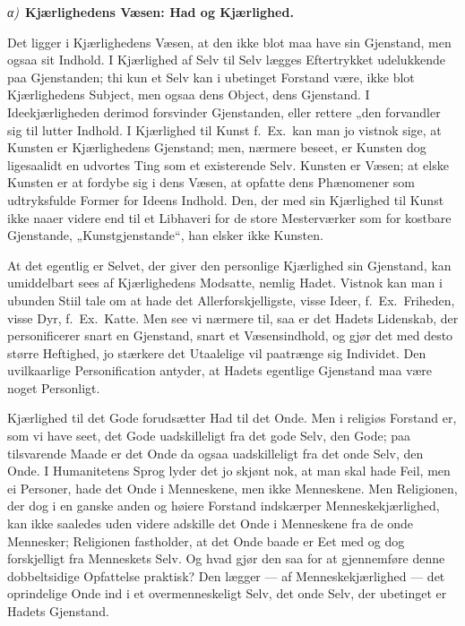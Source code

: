 \documentclass[12pt]{book}
\newcommand{\greekrun}[2]{%
  \medskip\begin{center}{\itshape #1)}\ {\bfseries #2}\end{center}\medskip}
\begin{document}
\greekrun{α}{Kjærlighedens Væsen: Had og Kjærlighed.}

Det ligger i Kjærlighedens Væsen, at den ikke blot maa have sin
Gjenstand, men ogsaa sit Indhold. I Kjærlighed af Selv til Selv
lægges Eftertrykket udelukkende paa Gjenstanden; thi kun et Selv kan
i ubetinget Forstand være, ikke blot Kjærlighedens Subject, men
ogsaa dens Object, dens Gjenstand. I Ideekjærligheden derimod
forsvinder Gjenstanden, eller rettere „den forvandler sig til lutter
Indhold.
I Kjærlighed til Kunst f.\ Ex.\ kan man jo vistnok sige,
at Kunsten er Kjærlighedens Gjenstand; men, nærmere beseet, er
Kunsten dog ligesaalidt en udvortes Ting som et existerende Selv.
Kunsten er Væsen; at elske Kunsten er at fordybe sig i dens Væsen,
at opfatte dens Phænomener som udtryksfulde Former for Ideens
Indhold. Den, der med sin Kjærlighed til Kunst ikke naaer videre end
til et Libhaveri for de store Mesterværker som for kostbare
Gjenstande, „Kunstgjenstande“, han elsker ikke Kunsten.

At det egentlig er Selvet, der giver den personlige Kjærlighed sin
Gjenstand, kan umiddelbart sees af Kjærlighedens Modsatte, nemlig
Hadet. Vistnok kan man i ubunden Stiil tale om at hade det
Allerforskjelligste, visse Ideer, f.\ Ex.\ Friheden, visse Dyr,
f.\ Ex.\ Katte. Men see vi nærmere til, saa er det Hadets
Lidenskab, der personificerer snart en Gjenstand, snart et
Væsensindhold, og gjør det med desto større Heftighed, jo stærkere
det Utaalelige vil paatrænge sig Individet. Den uvilkaarlige
Personification antyder, at Hadets egentlige Gjenstand maa være
noget Personligt.

Kjærlighed til det Gode forudsætter Had til det Onde. Men i religiøs
Forstand er, som vi have seet, det
Gode uadskilleligt fra det gode Selv, den Gode; paa tilsvarende
Maade er det Onde da ogsaa uadskilleligt fra det onde Selv, den
Onde. I Humanitetens Sprog lyder det jo skjønt nok, at man skal hade
Feil, men ei Personer, hade det Onde i Menneskene, men ikke
Menneskene. Men Religionen, der dog i en ganske anden og høiere
Forstand indskærper Menneskekjærlighed, kan ikke saaledes uden
videre adskille det Onde i Menneskene fra de onde Mennesker;
Religionen fastholder, at det Onde baade er Eet med og dog
forskjelligt fra Menneskets Selv. Og hvad gjør den saa for at
gjennemføre denne dobbeltsidige Opfattelse praktisk? Den lægger ---
af Menneskekjærlighed --- det oprindelige Onde ind i et
overmenneskeligt Selv, det onde Selv, der ubetinget er Hadets
Gjenstand.
\end{document}
